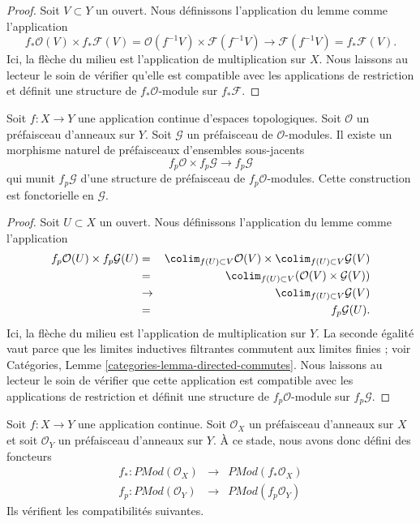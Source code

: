 \begin{proof}
Soit $V \subset Y$ un ouvert. Nous définissons l'application du lemme
comme l'application
$$
f_*\mathcal{O}(V) \times f_*\mathcal{F}(V)
=
\mathcal{O}(f^{-1}V) \times \mathcal{F}(f^{-1}V)
\to
\mathcal{F}(f^{-1}V)
=
f_*\mathcal{F}(V).
$$
Ici, la flèche du milieu est l'application de multiplication sur $X$.
Nous laissons au lecteur le soin de vérifier qu'elle est compatible avec les
applications de restriction et définit une structure de
$f_*\mathcal{O}$-module sur $f_*\mathcal{F}$.
\end{proof}

\begin{lemma}
\label{lemma-pullback-presheaf-module}
Soit $f : X \to Y$ une application continue d'espaces topologiques.
Soit $\mathcal{O}$ un préfaisceau d'anneaux sur $Y$. Soit
$\mathcal{G}$ un préfaisceau de $\mathcal{O}$-modules.
Il existe un morphisme naturel de préfaisceaux d'ensembles sous-jacents
$$
f_p\mathcal{O} \times f_p\mathcal{G}
\longrightarrow
f_p\mathcal{G}
$$
qui munit $f_p\mathcal{G}$ d'une structure de préfaisceau de $f_p\mathcal{O}$-modules.
Cette construction est fonctorielle en $\mathcal{G}$.
\end{lemma}

\begin{proof}
Soit $U \subset X$ un ouvert. Nous définissons l'application du lemme
comme l'application
\begin{eqnarray*}
f_p\mathcal{O}(U) \times f_p\mathcal{G}(U)
& = &
\colim_{f(U) \subset V} \mathcal{O}(V)
\times
\colim_{f(U) \subset V} \mathcal{G}(V) \\
& = &
\colim_{f(U) \subset V} (\mathcal{O}(V)\times \mathcal{G}(V)) \\
& \to &
\colim_{f(U) \subset V} \mathcal{G}(V) \\
& = &
f_p\mathcal{G}(U).
\end{eqnarray*}
Ici, la flèche du milieu est l'application de multiplication sur $Y$.
La seconde égalité vaut parce que les limites inductives filtrantes commutent
aux limites finies ; voir
Catégories, Lemme \ref{categories-lemma-directed-commutes}.
Nous laissons au lecteur le soin de vérifier que cette application est compatible avec les
applications de restriction et définit une structure de
$f_p\mathcal{O}$-module sur $f_p\mathcal{G}$.
\end{proof}

\noindent
Soit $f : X \to Y$ une application continue.
Soit $\mathcal{O}_X$ un préfaisceau d'anneaux sur $X$ et
soit $\mathcal{O}_Y$ un préfaisceau d'anneaux sur $Y$.
À ce stade, nous avons donc défini des foncteurs
\begin{eqnarray*}
f_* : \textit{PMod}(\mathcal{O}_X) &
\longrightarrow &
\textit{PMod}(f_*\mathcal{O}_X) \\
f_p : \textit{PMod}(\mathcal{O}_Y) &
\longrightarrow &
\textit{PMod}(f_p\mathcal{O}_Y)
\end{eqnarray*}
Ils vérifient les compatibilités suivantes.

